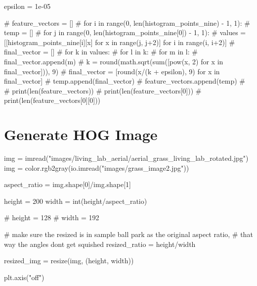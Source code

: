 \documentclass[
  letterpaper,
  DIV=11,
  numbers=noendperiod]{scrreprt}
\newenvironment{Shaded}{\begin{snugshade}}{\end{snugshade}}
\newcommand{\BuiltInTok}[1]{\textcolor[rgb]{0.00,0.23,0.31}{#1}}
\newcommand{\CommentTok}[1]{\textcolor[rgb]{0.37,0.37,0.37}{#1}}
\newcommand{\DecValTok}[1]{\textcolor[rgb]{0.68,0.00,0.00}{#1}}
\newcommand{\FloatTok}[1]{\textcolor[rgb]{0.68,0.00,0.00}{#1}}
\newcommand{\NormalTok}[1]{\textcolor[rgb]{0.00,0.23,0.31}{#1}}
\newcommand{\OperatorTok}[1]{\textcolor[rgb]{0.37,0.37,0.37}{#1}}
\newcommand{\StringTok}[1]{\textcolor[rgb]{0.13,0.47,0.30}{#1}}
\begin{document}
\begin{Shaded}
\begin{Highlighting}[]
\NormalTok{epsilon }\OperatorTok{=} \FloatTok{1e{-}05}

\CommentTok{\# feature\_vectors = []}
\CommentTok{\# for i in range(0, len(histogram\_points\_nine) {-} 1, 1):}
\CommentTok{\#   temp = []}
\CommentTok{\#   for j in range(0, len(histogram\_points\_nine[0]) {-} 1, 1):}
\CommentTok{\#     values = [[histogram\_points\_nine[i][x] for x in range(j, j+2)] for i in range(i, i+2)]}
\CommentTok{\#     final\_vector = []}
\CommentTok{\#     for k in values:}
\CommentTok{\#       for l in k:}
\CommentTok{\#         for m in l:}
\CommentTok{\#           final\_vector.append(m)}
\CommentTok{\#     k = round(math.sqrt(sum([pow(x, 2) for x in final\_vector])), 9)}
\CommentTok{\#     final\_vector = [round(x/(k + epsilon), 9) for x in final\_vector]}
\CommentTok{\#     temp.append(final\_vector)}
\CommentTok{\#   feature\_vectors.append(temp)}
\CommentTok{\#   }
\CommentTok{\# print(len(feature\_vectors))}
\CommentTok{\# print(len(feature\_vectors[0]))}
\CommentTok{\# print(len(feature\_vectors[0][0]))}
\end{Highlighting}
\end{Shaded}

\hypertarget{generate-hog-image}{%
\section{Generate HOG Image}\label{generate-hog-image}}

\begin{Shaded}
\begin{Highlighting}[]
\NormalTok{img }\OperatorTok{=}\NormalTok{ imread(}\StringTok{"images/living\_lab\_aerial/aerial\_grass\_living\_lab\_rotated.jpg"}\NormalTok{)}
\NormalTok{img }\OperatorTok{=}\NormalTok{ color.rgb2gray(io.imread(}\StringTok{"images/grass\_image2.jpg"}\NormalTok{))}

\NormalTok{aspect\_ratio }\OperatorTok{=}\NormalTok{ img.shape[}\DecValTok{0}\NormalTok{]}\OperatorTok{/}\NormalTok{img.shape[}\DecValTok{1}\NormalTok{]}

\NormalTok{height }\OperatorTok{=} \DecValTok{200}
\NormalTok{width }\OperatorTok{=} \BuiltInTok{int}\NormalTok{(height}\OperatorTok{/}\NormalTok{aspect\_ratio)}

\CommentTok{\# height = 128}
\CommentTok{\# width = 192}

\CommentTok{\# make sure the resized is in sample ball park as the original aspect ratio, }
\CommentTok{\# that way the angles don\textquotesingle{}t get squished}
\NormalTok{resized\_ratio }\OperatorTok{=}\NormalTok{ height}\OperatorTok{/}\NormalTok{width}


\NormalTok{resized\_img }\OperatorTok{=}\NormalTok{ resize(img, (height, width))}

\NormalTok{plt.axis(}\StringTok{"off"}\NormalTok{)}
\end{Highlighting}
\end{Shaded}
\end{document}
